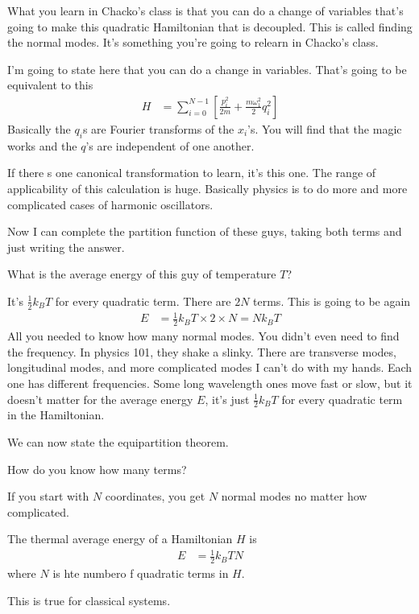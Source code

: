 What you learn in Chacko's class is that you can do a change of variables that's
going to make this quadratic Hamiltonian that is decoupled.
This is called finding the normal modes.
It's something you're going to relearn in Chacko's class.

I'm going to state here that you can do a change in variables.
That's going to be equivalent to this
\begin{align}
    H &=
    \sum_{i=0}^{N-1}\left[ 
    \frac{p_i^2}{2m}
    + \frac{m\omega_1^2}{2} q_i^2
    \right]
\end{align}
Basically the $q_i$s are Fourier transforms of the $x_i$'s.
You will find that the magic works and the $q$'s are independent of one another.

If there s one canonical transformation to learn,
it's this one.
The range of applicability of this calculation is huge.
Basically physics is to do more and more complicated cases of harmonic
oscillators.

Now I can complete the partition function of these guys,
taking both terms and just writing the answer.

What is the average energy of this guy of temperature $T$?

It's $\frac{1}{2}k_B T$ for every quadratic term.
There are $2N$ terms.
This is going to be again
\begin{align}
    E &= \frac{1}{2}k_B T \times 2 \times N = Nk_BT
\end{align}
All you needed to know how many normal modes.
You didn't even need to find the frequency.
In physics 101,
they shake a slinky.
There are transverse modes,
longitudinal modes,
and more complicated modes I can't do with my hands.
Each one has different frequencies.
Some long wavelength ones move fast or slow,
but it doesn't matter for the average energy $E$,
it's just $\frac{1}{2}k_BT$ for every quadratic term in the Hamiltonian.

We can now state the equipartition theorem.

\begin{question}
    How do you know how many terms?
\end{question}
If you start with $N$ coordinates,
you get $N$ normal modes no matter how complicated.

\begin{theorem}[Equipartition]
    The thermal average energy of a Hamiltonian $H$ is
    \begin{align}
        E &= \frac{1}{2} k_B T N
    \end{align}
    where $N$ is hte numbero f quadratic terms in $H$.
\end{theorem}
This is true for classical systems.


